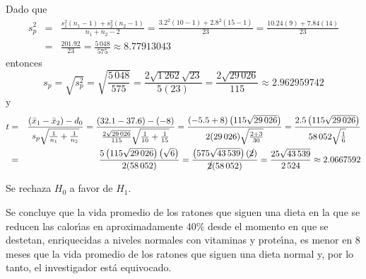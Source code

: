 \begin{solucion}
 \begin{estadistico}
  Dado que
  \begin{eqnarray*}
   s_p^2
   & = &
   \frac{s_1^2\left( n_1-1\right) +s_2^2\left( n_2-1\right)}{n_1+n_2-2}
   = \frac{3.2^2(10-1) + 2.8^2(15-1)}{23}
   = \frac{10.24(9)+7.84(14)}{23} \\
   & = & \frac{201.92}{23}
   = \frac{5\,048}{575}
   \approx 8.77913043
  \end{eqnarray*}
  entonces
  \begin{equation*}
   s_p = \sqrt{s_p^2} = \sqrt{\frac{5\,048}{575}}
   = \frac{2\sqrt{1\,262}\sqrt{23}}{5(23)}
   = \frac{2\sqrt{29\,026}}{115}
   \approx 2.962959742
  \end{equation*}
  y
  \begin{eqnarray*}
   t & = & \frac{
  \left( \bar{x}_1 - \bar{x}_2 \right) - d_0
  }{
  s_p\sqrt{\frac{1}{n_1} + \frac{1}{n_2}}
  }
  =
  \frac{
  (32.1 - 37.6) - (-8)
  }{
  \frac{2\sqrt{29\,026}}{115}\sqrt{ \frac{1}{10} + \frac{1}{15} }
  }
  =
  \frac{
  (-5.5+8)\left(115\sqrt{29\,026}\right)
  }{
  2(29\,026)\sqrt{\frac{2+3}{30}}
  }
  =
  \frac{
  2.5\left( 115\sqrt{29\,026} \right)
  }{
  58\,052 \sqrt{\frac{1}{6}}
  } \\
  & = &
  \frac{
  5 \left( 115\sqrt{29\,026} \right) \left( \sqrt{6} \right)
  }{
  2(58\,052)
  }
  = \frac{
  \left( 575\sqrt{43\,539} \right)(\cancel{2})
  }{
  \cancel{2}(58\,052)
  }
  = \frac{25\sqrt{43\,539}}{2\,524}
  \approx 2.0667592
  \end{eqnarray*}
 \end{estadistico}

 \begin{decision}
  Se rechaza $H_0$ a favor de $H_1$.
 \end{decision}

 \begin{conclusion}
  Se concluye que la vida promedio de los ratones que siguen una dieta
  en la que se reducen las calor\'{\i}as en aproximadamente 40\%
  desde el momento en que se destetan,
  enriquecidas a niveles normales con vitaminas y prote\'{\i}na,
  es menor en $8$ meses que la vida promedio de los ratones
  que siguen una dieta normal
  y, por lo tanto, el investigador est\'a equivocado.
 \end{conclusion}


\end{solucion}
